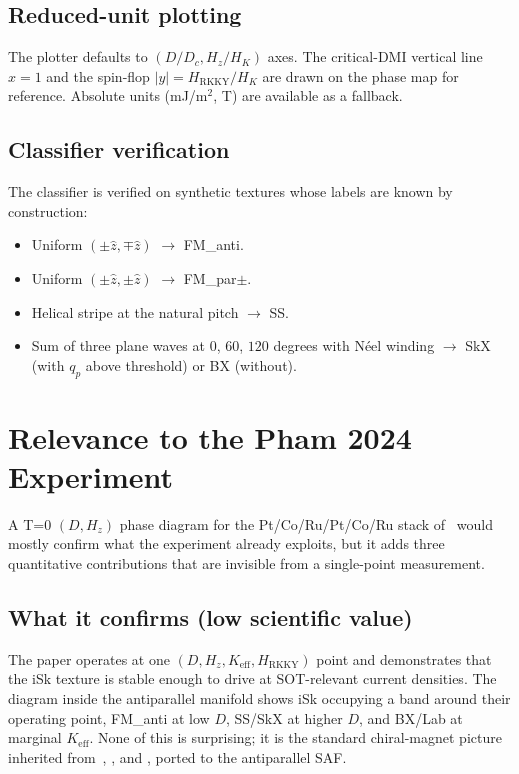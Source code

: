 \documentclass[11pt,a4paper]{article}
\newcommand{\zhat}{\hat{z}}
\newcommand{\Keff}{K_{\text{eff}}}
\newcommand{\HK}{H_K}
\newcommand{\Dc}{D_c}
\newcommand{\HRKKY}{H_{\text{RKKY}}}
\begin{document}
\subsection{Reduced-unit plotting}

The plotter defaults to $(D / \Dc, H_z / \HK)$ axes. The
critical-DMI vertical line $x = 1$ and the spin-flop
$|y| = \HRKKY / \HK$ are drawn on the phase map for
reference. Absolute units (mJ/m$^2$, T) are available as a
fallback.

\subsection{Classifier verification}

The classifier is verified on synthetic textures whose
labels are known by construction:
%
\begin{itemize}[nosep]
\item Uniform $(\pm\zhat, \mp\zhat)$ $\to$ FM\_anti.
\item Uniform $(\pm\zhat, \pm\zhat)$ $\to$ FM\_par$\pm$.
\item Helical stripe at the natural pitch $\to$ SS.
\item Sum of three plane waves at $0$, $60$, $120$
    degrees with N\'{e}el winding $\to$ SkX (with $q_p$
    above threshold) or BX (without).
\end{itemize}

\section{Relevance to the Pham 2024 Experiment}
\label{sec:pham_value}

A T=0 $(D, H_z)$ phase diagram for the Pt/Co/Ru/Pt/Co/Ru
stack of~\cite{pham2024} would mostly confirm what the
experiment already exploits, but it adds three quantitative
contributions that are invisible from a single-point
measurement.

\subsection{What it confirms (low scientific value)}

The paper operates at one
$(D, H_z, \Keff, \HRKKY)$ point and demonstrates that the
iSk texture is stable enough to drive at SOT-relevant
current densities. The diagram inside the antiparallel
manifold shows iSk occupying a band around their operating
point, FM\_anti at low $D$, SS/SkX at higher $D$, and
BX/Lab at marginal $\Keff$. None of this is surprising; it
is the standard chiral-magnet picture inherited
from~\cite{sampaio2013}, \cite{rohart2013}, and
\cite{buttner2018}, ported to the antiparallel SAF.
\end{document}
